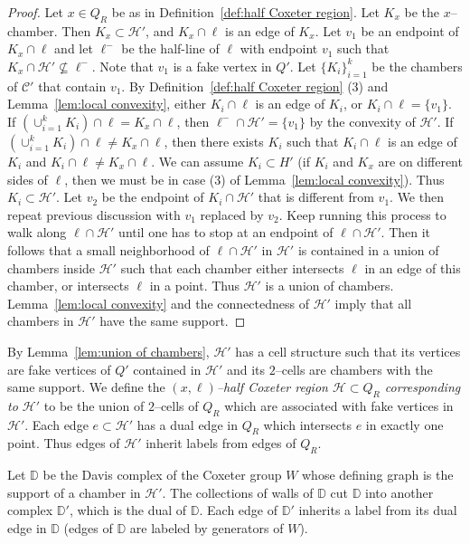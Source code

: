 \documentclass[11pt]{amsart}
\newcommand {\C}{\mathcal C}
\newcommand {\D}{\mathbb D}
\newcommand {\h}{\mathcal H}
\theoremstyle{definition}
\begin{document}
\begin{proof}
Let $x\in Q_R$ be as in Definition~\ref{def:half Coxeter region}. Let $K_x$ be the $x$--chamber. Then $K_x\subset \h'$, and $K_x\cap \ell$ is an edge of $K_x$. Let $v_1$ be an endpoint of $K_x\cap \ell$ and let $\ell^-$ be the half-line of $\ell$ with endpoint $v_1$ such that $K_x\cap\h'\nsubseteq \ell^-$. Note that $v_1$ is a fake vertex in $Q'$. Let $\{K_i\}_{i=1}^k$ be the chambers of $\C'$ that contain $v_1$. By Definition~\ref{def:half Coxeter region} (3) and Lemma~\ref{lem:local convexity}, either $K_i\cap \ell$ is an edge of $K_i$, or $K_i\cap \ell=\{v_1\}$. If $(\cup_{i=1}^k K_i)\cap \ell=K_x\cap \ell$, then $\ell^-\cap\h'=\{v_1\}$ by the convexity of $\h'$. If $(\cup_{i=1}^k K_i)\cap \ell\neq K_x\cap \ell$, then there exists $K_i$ such that $K_i\cap\ell$ is an edge of $K_i$ and $K_i\cap\ell\neq K_x\cap \ell$. We can assume $K_i\subset H'$ (if $K_i$ and $K_x$ are on different sides of $\ell$, then we must be in case (3) of Lemma~\ref{lem:local convexity}). Thus $K_i\subset\h'$. Let $v_2$ be the endpoint of $K_i\cap \h'$ that is different from $v_1$. We then repeat previous discussion with $v_1$ replaced by $v_2$. Keep running this process to walk along $\ell\cap\h'$ until one has to stop at an endpoint of $\ell\cap\h'$. Then it follows that a small neighborhood of $\ell\cap\h'$ in $\h'$ is contained in a union of chambers inside $\h'$ such that each chamber either intersects $\ell$ in an edge of this chamber, or intersects $\ell$ in a point. Thus $\h'$ is a union of chambers. Lemma~\ref{lem:local convexity} and the connectedness of $\h'$ imply that all chambers in $\h'$ have the same support.
\end{proof}

By Lemma~\ref{lem:union of chambers}, $\h'$ has a cell structure such that its vertices are fake vertices of $Q'$ contained in $\h'$ and its $2$--cells are chambers with the same support. We define the \emph{$(x,\ell)$--half Coxeter region $\h\subset Q_R$ corresponding to $\h'$} to be the union of $2$--cells of $Q_R$ which are associated with fake vertices in $\h'$. Each edge $e\subset \h'$ has a dual edge in $Q_R$ which intersects $e$ in exactly one point. Thus edges of $\h'$ inherit labels from edges of $Q_R$. 

Let $\D$ be the Davis complex of the Coxeter group $W$ whose defining graph is the support of a chamber in $\h'$. The collections of walls of $\D$ cut $\D$ into another complex $\D'$, which is the dual of $\D$. Each edge of $\D'$ inherits a label from its dual edge in $\D$ (edges of $\D$ are labeled by generators of $W$).
\end{document}
